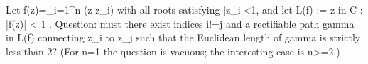 Let f(z)=\prod_{i=1}^n (z-z_i) with all roots satisfying |z_i|<1, and let
  L(f) := { z in C : |f(z)| < 1 }.
Question: must there exist indices i!=j and a rectifiable path gamma in L(f) connecting z_i to z_j such that the Euclidean length of gamma is strictly less than 2?
(For n=1 the question is vacuous; the interesting case is n>=2.)
